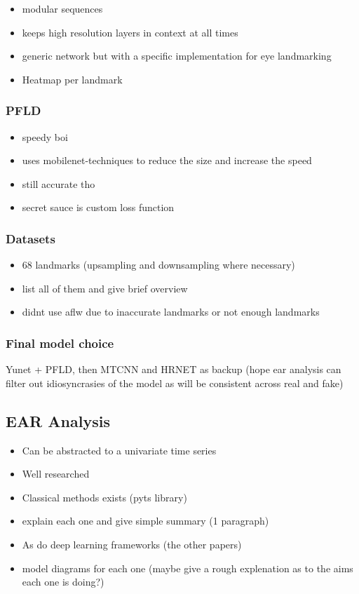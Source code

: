 \begin{itemize}
    \item modular sequences
    \item keeps high resolution layers in context at all times
    \item generic network but with a specific implementation for eye landmarking
    \item Heatmap per landmark
\end{itemize}

\subsubsection{PFLD}

\begin{itemize}
    \item speedy boi
    \item uses mobilenet-techniques to reduce the size and increase the speed
    \item still accurate tho
    \item secret sauce is custom loss function
\end{itemize}

\subsubsection{Datasets}

\begin{itemize}
    \item 68 landmarks (upsampling and downsampling where necessary)
    \item list all of them and give brief overview
    \item didnt use aflw due to inaccurate landmarks or not enough landmarks
\end{itemize}

\subsubsection{Final model choice}

Yunet + PFLD, then MTCNN and HRNET as backup (hope ear analysis can filter out idiosyncrasies of the model as will be consistent across real and fake)

\subsection{EAR Analysis}

\begin{itemize}
    \item Can be abstracted to a univariate time series
    \item Well researched
    \item Classical methods exists (pyts library)
    \item explain each one and give simple summary (1 paragraph)
    \item As do deep learning frameworks (the other papers)
    \item model diagrams for each one (maybe give a rough explenation as to the aims each one is doing?)
\end{itemize}

